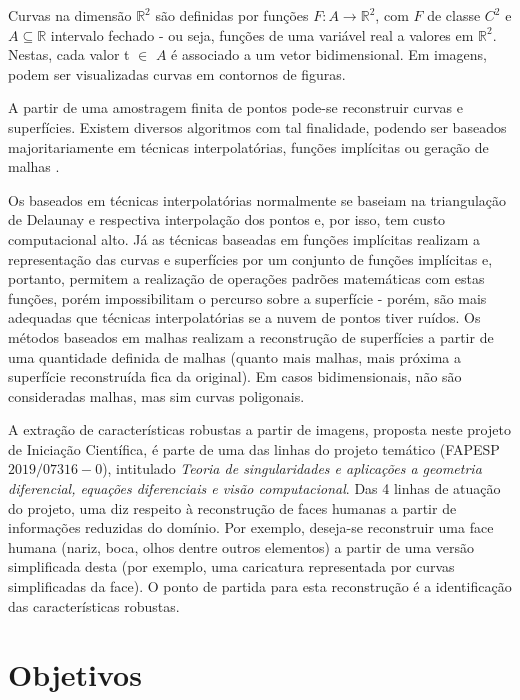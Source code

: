 \documentclass[
	12pt,				%
	oneside,			%
	a4paper,			%
	sumario=tradicional,
	english,			%
	french,				%
	spanish,			%
	brazil,				%
]{abntex2}
\begin{document}
Curvas na dimensão $\mathbb{R}^2$ são definidas por funções $F: A \rightarrow \mathbb{R}^2$, com $F$ de classe $C^2$ e $A \subseteq \mathbb{R}$ intervalo fechado - ou seja, funções de uma variável real a valores em $\mathbb{R}^2$. Nestas, cada valor t $\in$ $A$ é associado a um vetor bidimensional. Em imagens, podem ser visualizadas curvas em contornos de figuras.

A partir de uma amostragem finita de pontos pode-se reconstruir curvas e superfícies. Existem diversos algoritmos com tal finalidade, podendo ser baseados majoritariamente em técnicas interpolatórias, funções implícitas ou geração de malhas \cite{book_sorkine}.

Os baseados em técnicas interpolatórias normalmente se baseiam na triangulação de Delaunay \cite{compgeometry} e respectiva interpolação dos pontos e, por isso, tem custo computacional alto. Já as técnicas baseadas em funções implícitas realizam a representação das curvas e superfícies por um conjunto de funções implícitas e, portanto, permitem a realização de operações padrões matemáticas com estas funções, porém impossibilitam o percurso sobre a superfície - porém, são mais adequadas que técnicas interpolatórias se a nuvem de pontos tiver ruídos. Os métodos baseados em malhas realizam a reconstrução de superfícies a partir de uma quantidade definida de malhas (quanto mais malhas, mais próxima a superfície reconstruída fica da original). Em casos bidimensionais, não são consideradas malhas, mas sim curvas poligonais.

A extração de características robustas a partir de imagens, proposta neste projeto de Iniciação Científica, é parte de uma das linhas do projeto temático (FAPESP $2019/07316-0$), intitulado \textit{Teoria de singularidades e aplicações a geometria diferencial, equações diferenciais e visão computacional}. Das 4 linhas de atuação do projeto, uma diz respeito à reconstrução de faces humanas a partir de informações reduzidas do domínio. Por exemplo, deseja-se reconstruir uma face humana (nariz, boca, olhos dentre outros elementos) a partir de uma versão simplificada desta (por exemplo, uma caricatura representada por curvas simplificadas da face). O ponto de partida para esta reconstrução é a identificação das características robustas.      

\chapter{Objetivos}
\end{document}

